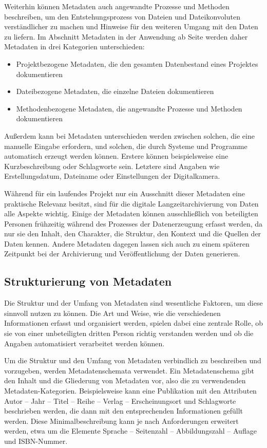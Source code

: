 Weiterhin können Metadaten auch angewandte Prozesse und Methoden beschreiben, um den Entstehungsprozess von Dateien und Dateikonvoluten verständlicher zu machen und Hinweise für den weiteren Umgang mit den Daten zu liefern. Im Abschnitt Metadaten in der Anwendung ab Seite \pageref{Metadaten-anwendung} werden daher Metadaten in drei Kategorien unterschieden:
\begin{itemize}
	\item Projektbezogene Metadaten, die den gesamten Datenbestand eines Projektes dokumentieren
	\item Dateibezogene Metadaten, die einzelne Dateien dokumentieren
	\item Methodenbezogene Metadaten, die angewandte Prozesse und Methoden dokumentieren
\end{itemize}

Außerdem kann bei Metadaten unterschieden werden zwischen solchen, die eine manuelle Eingabe erfordern, und solchen, die durch Systeme und Programme automatisch erzeugt werden können. Erstere können beispielsweise eine Kurzbeschreibung oder Schlagworte sein. Letztere sind Angaben wie Erstellungsdatum, Dateiname oder Einstellungen der Digitalkamera.

Während für ein laufendes Projekt nur ein Ausschnitt dieser Metadaten eine praktische Relevanz besitzt, sind für die digitale Langzeitarchivierung von Daten alle Aspekte wichtig. Einige der Metadaten können ausschließlich von beteiligten Personen frühzeitig während des Prozesses der Datenerzeugung erfasst werden, da nur sie den Inhalt, den Charakter, die Struktur, den Kontext und die Quellen der Daten kennen. Andere Metadaten dagegen lassen sich auch zu einem späteren Zeitpunkt bei der Archivierung und Veröffentlichung der Daten generieren.



\subsection{Strukturierung von Metadaten}
Die Struktur und der Umfang von Metadaten sind wesentliche Faktoren, um diese sinnvoll nutzen zu können. Die Art und Weise, wie die verschiedenen Informationen erfasst und organisiert werden, spielen dabei eine zentrale Rolle, ob sie von einer unbeteiligten dritten Person richtig verstanden werden und ob die Angaben automatisiert verarbeitet werden können. 

Um die Struktur und den Umfang von Metadaten verbindlich zu beschreiben und vorzugeben, werden Metadatenschemata verwendet. Ein Metadatenschema gibt den Inhalt und die Gliederung von Metadaten vor, also die zu verwendenden Metadaten-Kategorien. Beispielsweise kann eine Publikation mit den Attributen Autor -- Jahr -- Titel -- Reihe -- Verlag -- Erscheinungsort und Schlagworte beschrieben werden, die dann mit den entsprechenden Informationen gefüllt werden. Diese Minimalbeschreibung kann je nach Anforderungen erweitert werden, etwa um die Elemente Sprache -- Seitenzahl -- Abbildungszahl -- Auflage und ISBN-Nummer.

